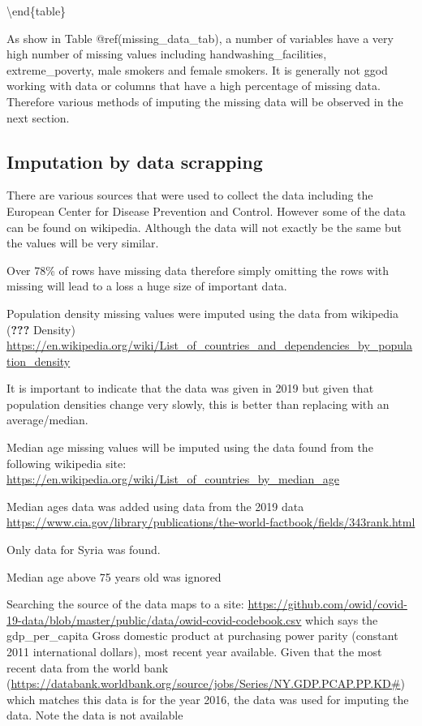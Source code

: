 \documentclass[
]{article}
\begin{document}
\textbackslash end\{table\}

As show in Table @ref(missing\_data\_tab), a number of variables have a very high number of missing values including handwashing\_facilities, extreme\_poverty, male smokers and female smokers. It is generally not ggod working with data or columns that have a high percentage of missing data. Therefore various methods of imputing the missing data will be observed in the next section.

\hypertarget{imputation-by-data-scrapping}{%
\subsection{Imputation by data scrapping}\label{imputation-by-data-scrapping}}

There are various sources that were used to collect the data including the European Center for Disease Prevention and Control. However some of the data can be found on wikipedia. Although the data will not exactly be the same but the values will be very similar.

Over 78\% of rows have missing data therefore simply omitting the rows with missing will lead to a loss a huge size of important data.

Population density missing values were imputed using the data from wikipedia ({\textbf{???}} Density) \url{https://en.wikipedia.org/wiki/List_of_countries_and_dependencies_by_population_density}

It is important to indicate that the data was given in 2019 but given that population densities change very slowly, this is better than replacing with an average/median.

Median age missing values will be imputed using the data found from the following wikipedia site: \url{https://en.wikipedia.org/wiki/List_of_countries_by_median_age}

Median ages data was added using data from the 2019 data \url{https://www.cia.gov/library/publications/the-world-factbook/fields/343rank.html}

Only data for Syria was found.

Median age above 75 years old was ignored

Searching the source of the data maps to a site: \url{https://github.com/owid/covid-19-data/blob/master/public/data/owid-covid-codebook.csv} which says the gdp\_per\_capita Gross domestic product at purchasing power parity (constant 2011 international dollars), most recent year available. Given that the most recent data from the world bank (\url{https://databank.worldbank.org/source/jobs/Series/NY.GDP.PCAP.PP.KD\#}) which matches this data is for the year 2016, the data was used for imputing the data. Note the data is not available
\end{document}
